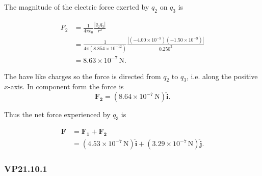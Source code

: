 \documentclass{article}
\begin{document}
The magnitude of the electric force exerted by $q_2$ on $q_3$ is

\begin{align*}
  F_2 & = \frac{1}{4\pi\epsilon_0} \frac{|q_2 q_3|}{r^2}                                                          \\
      & = \frac{1}{4 \pi (8.854 \times 10^{-12})} \frac{|(-4.00 \times 10^{-9}) (-1.50 \times 10^{-9})|}{0.250^2} \\
      & = 8.63 \times 10^{-7} \,\textrm{N}.
\end{align*}

The have like charges so the force is directed from $q_2$ to $q_3$, i.e. along the positive $x$-axis. In component form the force is \[\mathbf{F_2} = (8.64 \times 10^{-7} \,\textrm{N})\hat{\mathbf{i}}.\]

Thus the net force experienced by $q_3$ is

\begin{align*}
  \mathbf{F} & = \mathbf{F_1} + \mathbf{F_2}                                                                                \\
             & = (4.53 \times 10^{-7} \,\textrm{N}) \hat{\mathbf{i}} + (3.29 \times 10^{-7} \,\textrm{N}) \hat{\mathbf{j}}.
\end{align*}

\subsubsection{VP21.10.1}
\end{document}
